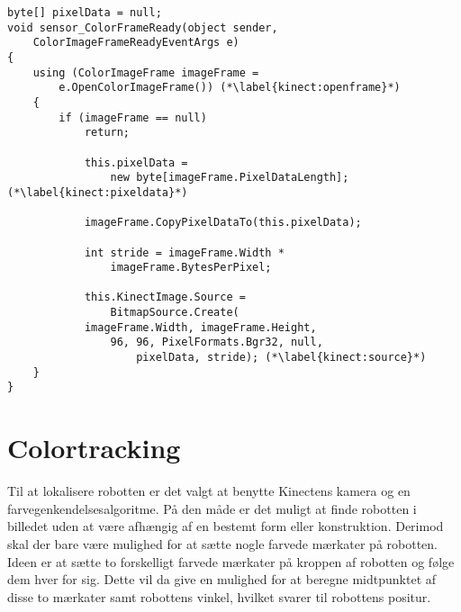 \begin{lstlisting}[style=csharp,caption={Visning af billeddata fra Kinectens RGB-kamera.}, label=kinect:picture]
byte[] pixelData = null;
void sensor_ColorFrameReady(object sender,
	ColorImageFrameReadyEventArgs e)
{
    using (ColorImageFrame imageFrame = 
    	e.OpenColorImageFrame()) (*\label{kinect:openframe}*)
    {
        if (imageFrame == null)
            return;

            this.pixelData = 
            	new byte[imageFrame.PixelDataLength];(*\label{kinect:pixeldata}*)

            imageFrame.CopyPixelDataTo(this.pixelData);

            int stride = imageFrame.Width *
            	imageFrame.BytesPerPixel;

            this.KinectImage.Source = 
            	BitmapSource.Create(
            imageFrame.Width, imageFrame.Height, 
            	96, 96, PixelFormats.Bgr32, null, 
            		pixelData, stride); (*\label{kinect:source}*)
    }
}    
\end{lstlisting}

\section{Colortracking}
Til at lokalisere robotten er det valgt at benytte Kinectens kamera og en farvegenkendelsesalgoritme.
På den måde er det muligt at finde robotten i billedet uden at være afhængig af en bestemt form eller konstruktion.
Derimod skal der bare være mulighed for at sætte nogle farvede mærkater på robotten.
Ideen er at sætte to forskelligt farvede mærkater på kroppen af robotten og følge dem hver for sig. 
Dette vil da give en mulighed for at beregne midtpunktet af disse to mærkater samt robottens vinkel, hvilket svarer til robottens positur.